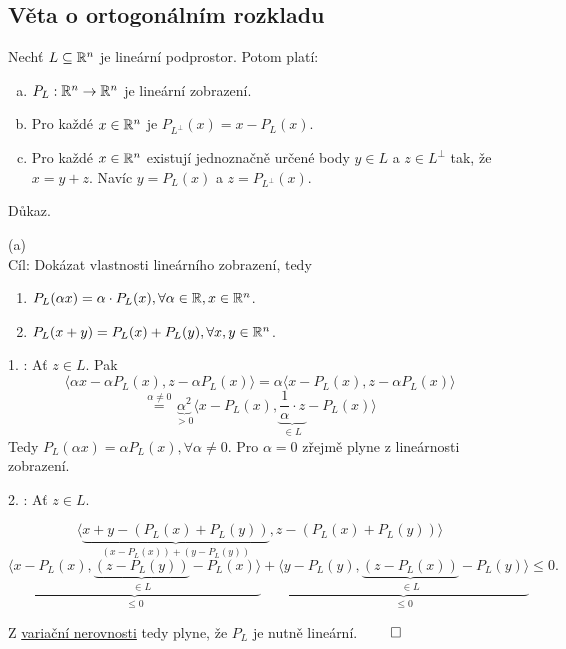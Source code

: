 \subsection{Věta o ortogonálním rozkladu} \label{ortoRoz}

Nechť $L \subseteq \mathbb{R}^n$ je lineární podprostor. Potom platí:

\begin{enumerate}[(a)]
    \item $P_L : \mathbb{R}^n \rightarrow \mathbb{R}^n$ je lineární zobrazení.
    \item Pro každé $x \in \mathbb{R}^n$ je $P_{L^\perp} (x) = x - P_L (x)$.
    \item Pro každé $x \in \mathbb{R}^n$ existují jednoznačně určené body $y \in L$ a $z \in L^\perp$ tak, že $x=y + z$. Navíc 
    $y = P_L(x)$ a $z=P_{L^ \perp} (x)$.
\end{enumerate}

Důkaz.

(a)\\
Cíl: Dokázat vlastnosti lineárního zobrazení, tedy 
\begin{enumerate}
    \item $P_L (\alpha x) = \alpha \cdot P_L (x), \forall \alpha \in \mathbb{R}, x \in \mathbb{R}^n$.
    \item $P_L (x + y) =   P_L (x) +  P_L (y), \forall x,y \in \mathbb{R}^n$.
\end{enumerate}

1. : Ať $z \in L$.
Pak 
\[
    \langle \alpha x - \alpha P_L (x), z - \alpha P_L (x) \rangle = \alpha  \langle x - P_L (x), z - \alpha P_L (x)\rangle
\]
\[
    \stackrel{\alpha \not= 0}{=} \underbrace{\alpha^2}_{> 0} \langle x - P_L (x), \underbrace{\frac{1}{\alpha} 
    \cdot z}_{\in L} - P_L (x)\rangle
\]
Tedy $P_L(\alpha x) = \alpha P_L(x), \forall \alpha \not= 0$. Pro $\alpha =0$ zřejmě plyne z lineárnosti zobrazení.

2. : Ať $z \in L$.

\[
    \langle \underbrace{x + y - (P_L(x) + P_L(y))}_{(x-P_L(x)) + (y - P_L(y))}, z - (P_L (x) + P_L(y)) \rangle
\]
\[
    \underbrace{\langle x - P_L(x), \underbrace{(z - P_L(y))}_{\in L} - P_L(x)\rangle}_{\leq 0} + 
    \underbrace{\langle y - P_L(y), \underbrace{(z - P_L(x))}_{\in L}  - P_L (y)\rangle}_{\leq 0} \leq 0.
\]

Z \hyperref[varNer]{variační nerovnosti} tedy plyne, že $P_L$ je nutně lineární. $\qed$

